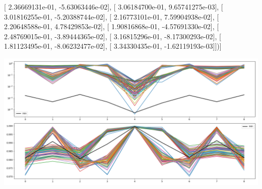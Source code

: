 \documentclass{article}
\begin{document}
       [  2.36669131e-01,  -5.63063446e-02],
       [  3.06184700e-01,   9.65741275e-03],
       [  3.01816255e-01,  -5.20388744e-02],
       [  2.16773101e-01,   7.59904938e-02],
       [  2.20648588e-01,   4.78429853e-02],
       [  1.90816868e-01,  -4.57691330e-02],
       [  2.48769015e-01,  -3.89444365e-02],
       [  3.16815296e-01,  -8.17300293e-02],
       [  1.81123495e-01,  -8.06232477e-02],
       [  3.34330435e-01,  -1.62119193e-03]])]
\begin{center}
\includegraphics[scale=.9]{report_pickled_controls44/control_dpn_all.png}

\end{center}
\end{document}
